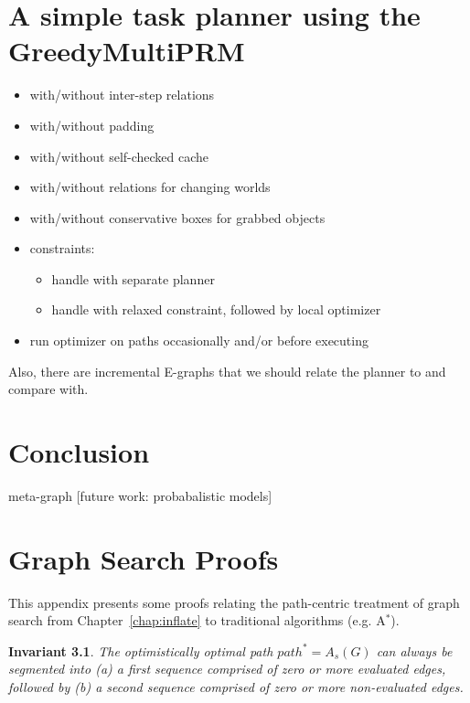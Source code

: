 \documentclass{report}
\newtheorem{invariant}{Invariant}
\begin{document}
\newpage
\chapter{A simple task planner using the GreedyMultiPRM}

\begin{itemize}
\item with/without inter-step relations
\item with/without padding
\item with/without self-checked cache
\item with/without relations for changing worlds
\item with/without conservative boxes for grabbed objects
\item constraints:
   \begin{itemize}
   \item handle with separate planner
   \item handle with relaxed constraint, followed by local optimizer
   \end{itemize}
\item run optimizer on paths occasionally and/or before executing
\end{itemize}

Also, there are incremental E-graphs \cite{phillips2013anytimeegraphs}
that we should relate the planner to and compare with.

\newpage
\chapter{Conclusion}

meta-graph [future work: probabalistic models]


{\small


}

\appendix
\chapter{Graph Search Proofs}
\label{appendix:gs-proofs}

This appendix presents some proofs relating the path-centric treatment
of graph search from Chapter~\ref{chap:inflate}
to traditional algorithms (e.g. A$^*$).

\begin{invariant}
The optimistically optimal path $path^* = A_s(G)$ can always be
segmented into
(a) a first sequence comprised of zero or more evaluated edges,
followed by
(b) a second sequence comprised of zero or more non-evaluated edges.
\label{inv:path-segmentation}
\end{invariant}
\end{document}
